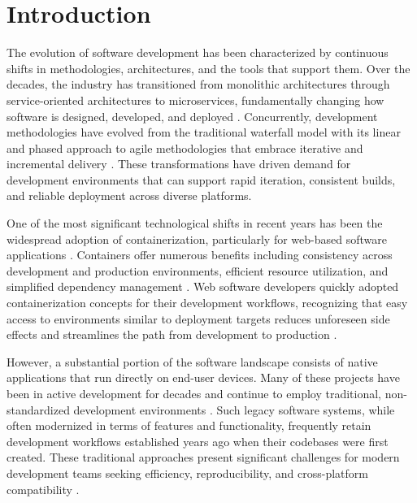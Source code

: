 \chapter{Introduction}
\label{ch:introduction}

The evolution of software development has been characterized by continuous shifts in methodologies, architectures, and the tools that support them.
Over the decades, the industry has transitioned from monolithic architectures through service-oriented architectures to microservices, fundamentally changing how software is designed, developed, and deployed \citep{newmanBuildingMicroservicesDesigning2015}.
Concurrently, development methodologies have evolved from the traditional waterfall model with its linear and phased approach to agile methodologies that embrace iterative and incremental delivery \citep{abrahamssonAgileSoftwareDevelopment2002}.
These transformations have driven demand for development environments that can support rapid iteration, consistent builds, and reliable deployment across diverse platforms.

One of the most significant technological shifts in recent years has been the widespread adoption of containerization, particularly for web-based software applications \citep{merkelDockerLightweightLinux2014}.
Containers offer numerous benefits including consistency across development and production environments, efficient resource utilization, and simplified dependency management \citep{boettigerIntroductionDockerReproducible2015}.
Web software developers quickly adopted containerization concepts for their development workflows, recognizing that easy access to environments similar to deployment targets reduces unforeseen side effects and streamlines the path from development to production \citep{citoUsingDockerContainers2016}.

However, a substantial portion of the software landscape consists of native applications that run directly on end-user devices.
Many of these projects have been in active development for decades and continue to employ traditional, \mbox{non-standardized} development environments \citep{feathersWorkingEffectivelyLegacy2004}.
Such legacy software systems, while often modernized in terms of features and functionality, frequently retain development workflows established years ago when their codebases were first created.
These traditional approaches present significant challenges for modern development teams seeking efficiency, reproducibility, and cross-platform compatibility \citep{annettWorkingLegacySystems2019}.

